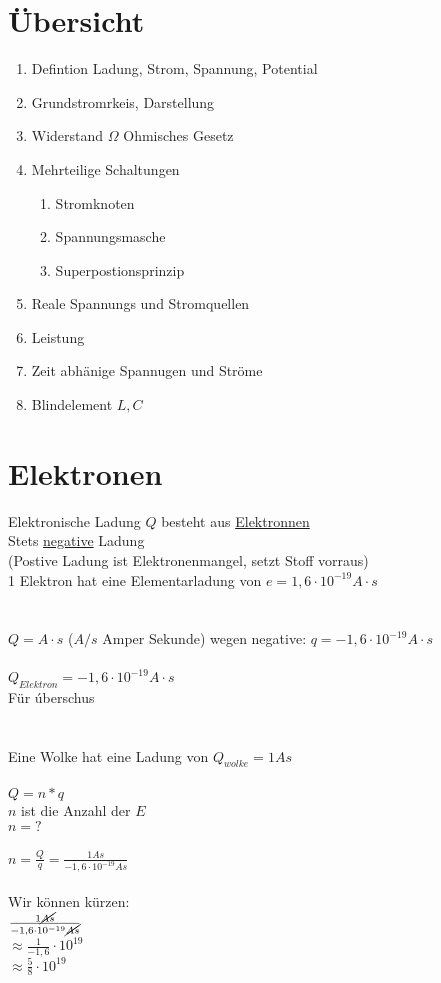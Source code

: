 \section{Übersicht}
\begin{enumerate}
  \item Defintion Ladung, Strom, Spannung, Potential
  \item Grundstromrkeis, Darstellung
  \item Widerstand $\Omega$ Ohmisches Gesetz
  \item Mehrteilige Schaltungen
  \begin{enumerate}[label*=\arabic*.]
    \item Stromknoten
    \item Spannungsmasche
    \item Superpostionsprinzip
  \end{enumerate}
  \item Reale Spannungs und Stromquellen
  \item Leistung
  \item Zeit abhänige Spannugen und Ströme
  \item Blindelement $L,C$
\end{enumerate}


\section{Elektronen}

Elektronische Ladung $Q$ besteht aus \underline{Elektronnen}\\
Stets \underline{negative} Ladung \\
(Postive Ladung ist Elektronenmangel, setzt Stoff vorraus)\\
1 Elektron hat eine Elementarladung von $e = 1,6 \cdot 10^{-19} A \cdot s$\\
\\
\\
$ Q = A \cdot s $ ($A/s$  Amper Sekunde) wegen negative: $q = -1,6 \cdot 10^{-19} A \cdot s$\\
\\
$Q_{Elektron} = -1,6 \cdot 10^{-19} A \cdot s$\\
Für úberschus\\
\\
\\
Eine Wolke hat eine Ladung von $Q_{wolke} = 1 As$\\
\\
$ Q = n * q$\\
$n$ ist die Anzahl der $E$\\
$n = ? $\\
\\
$n = \frac{Q}{q} = \frac{1 As}{-1,6 \cdot 10^{-19} As}$\\
\\
Wir können kürzen:\\
$\frac{1 \cancel{As}}{-1,6 \cdot 10^{-19} \cancel{As}}$\\
$\approx \frac{1}{-1,6} \cdot 10^{19}$\\
$\approx \frac{5}{8} \cdot 10^{19}$\\
\\
\newpage

